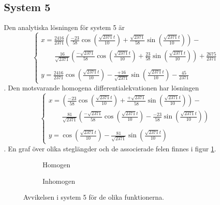 \subsection{System 5}
Den analytiska lösningen för system 5 är
\begin{equation*}
    \begin{cases}
        x=\frac{2416}{2371}(\frac{-23}{58}\cos(\frac{\sqrt{2371}t}{10})+\frac{\sqrt{2371}}{58}\sin(\frac{\sqrt{2371}t}{10}))-\\
        \qquad \frac{16}{\sqrt{2371}}(\frac{-\sqrt{2371}}{58}\cos(\frac{\sqrt{2371}t}{10})+\frac{23}{58}\sin(\frac{\sqrt{2371}t}{10}))+\frac{2675}{2371}\\
        \\[-7.5pt]
        y=\frac{2416}{2371}\cos(\frac{\sqrt{2371}t}{10})-\frac{+16}{\sqrt{2371}}\sin(\frac{\sqrt{2371}t}{10})-\frac{45}{2371}
    \end{cases}
\end{equation*}. Den motsvarande homogena differentialekvationen har lösningen 
\begin{equation*}
    \begin{cases}
        x=(\frac{-23}{58}\cos(\frac{\sqrt{2371}t}{10})+\frac{+\sqrt{2371}}{58}\sin(\frac{\sqrt{2371}t}{10}))-\\
        \qquad \frac{81}{\sqrt{2371}}(\frac{-\sqrt{2371}}{58}\cos(\frac{\sqrt{2371}t}{10})-\frac{-23}{58}\sin(\frac{\sqrt{2371}t}{10}))\\
        \\[-7.5pt]
        y=\cos(\frac{\sqrt{2371}t}{10})-\frac{81}{\sqrt{2371}}\sin(\frac{\sqrt{2371}t}{10})
    \end{cases}
\end{equation*}. En graf över olika steglängder och de associerade felen finnes i figur \ref{fig:diagram_sys_5_errors}.

\begin{figure}[h!]
    \centering

    \begin{subfigure}[h]{\textwidth}
        
        \caption{Homogen}
    \end{subfigure}
    \vspace{1em}\newline
    \begin{subfigure}[h]{\textwidth}
        
        \caption{Inhomogen}
    \end{subfigure}

    \caption{Avvikelsen i system 5 för de olika funktionerna.}
    \label{fig:diagram_sys_5_errors}
\end{figure}

